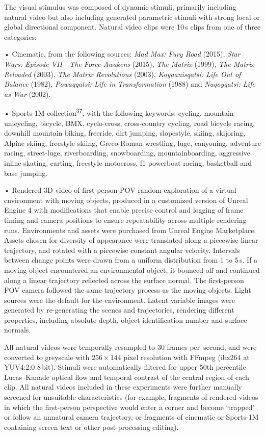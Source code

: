 \documentclass{article}
\begin{document}
The visual stimulus was composed of dynamic stimuli, primarily including natural video but also including generated parametric stimuli with strong local or global directional component. Natural video clips were 10\,s clips from one of three categories:

\begin{hangpars}
• Cinematic, from the following sources: \emph{Mad Max: Fury Road} (2015), \emph{Star Wars: Episode VII—The Force Awakens} (2015), \emph{The Matrix} (1999), \emph{The Matrix Reloaded} (2003), \emph{The Matrix Revolutions} (2003), \emph{Koyaanisqatsi: Life Out of Balance} (1982), \emph{Powaqqatsi: Life in Transformation} (1988) and \emph{Naqoyqatsi: Life as War} (2002).

• Sports-1M collection\textsuperscript{37}, with the following keywords: cycling, mountain unicycling, bicycle, BMX, cyclo-cross, cross-country cycling, road bicycle racing, downhill mountain biking, freeride, dirt jumping, slopestyle, skiing, skijoring, Alpine skiing, freestyle skiing, Greco-Roman wrestling, luge, canyoning, adventure racing, street-luge, riverboarding, snowboarding, mountainboarding, aggressive inline skating, carting, freestyle motocross, f1 powerboat racing, basketball and base jumping.

• Rendered 3D video of first-person POV random exploration of a virtual environment with moving objects, produced in a customized version of Unreal Engine 4 with modifications that enable precise control and logging of frame timing and camera positions to ensure repeatability across multiple rendering runs. Environments and assets were purchased from Unreal Engine Marketplace. Assets chosen for diversity of appearance were translated along a piecewise linear trajectory, and rotated with a piecewise constant angular velocity. Intervals between change points were drawn from a uniform distribution from 1 to 5\,s. If a moving object encountered an environmental object, it bounced off and continued along a linear trajectory reflected across the surface normal. The first-person POV camera followed the same trajectory process as the moving objects. Light sources were the default for the environment. Latent variable images were generated by re-generating the scenes and trajectories, rendering different properties, including absolute depth, object identification number and surface normals.
\end{hangpars}

All natural videos were temporally resampled to 30 frames per~second, and were converted to greyscale with 256\,×\,144 pixel resolution with FFmpeg (ibx264 at YUV4:2:0 8\,bit). Stimuli were automatically filtered for upper 50th percentile Lucas–Kanade optical flow and temporal contrast of the central region of each clip. All natural videos included in these experiments were further manually screened for unsuitable characteristics (for example, fragments of rendered videos in which the first-person perspective would enter a corner and become ‘trapped’ or follow an unnatural camera trajectory, or fragments of cinematic or Sports-1M containing screen text or other post-processing editing).
\end{document}

